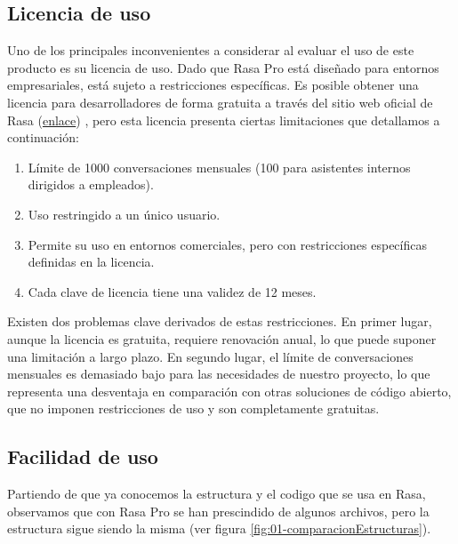 \documentclass[a4paper,11pt]{article}
\begin{document}
		\subsection{Licencia de uso}
			
			Uno de los principales inconvenientes a considerar al evaluar el uso de este producto es su licencia de uso. Dado que Rasa Pro está diseñado para entornos empresariales, está sujeto a restricciones específicas. Es posible obtener una licencia para desarrolladores de forma gratuita a través del sitio web oficial de Rasa (\textcolor{blue}{\href{https://rasa.com/docs/rasa-pro/}{enlace}}) \cite{01_RasaProIntro}, pero esta licencia presenta ciertas limitaciones que detallamos a continuación:
			
			\begin{enumerate}
				\item Límite de 1000 conversaciones mensuales (100 para asistentes internos dirigidos a empleados).
				\item Uso restringido a un único usuario.
				\item Permite su uso en entornos comerciales, pero con restricciones específicas definidas en la licencia.
				\item Cada clave de licencia tiene una validez de 12 meses.
			\end{enumerate}
			
			Existen dos problemas clave derivados de estas restricciones. En primer lugar, aunque la licencia es gratuita, requiere renovación anual, lo que puede suponer una limitación a largo plazo. En segundo lugar, el límite de conversaciones mensuales es demasiado bajo para las necesidades de nuestro proyecto, lo que representa una desventaja en comparación con otras soluciones de código abierto, que no imponen restricciones de uso y son completamente gratuitas.
			
		\subsection{Facilidad de uso}
		
			Partiendo de que ya conocemos la estructura y el codigo que se usa en Rasa, observamos que con Rasa Pro se han prescindido de algunos archivos, pero la estructura sigue siendo la misma (ver figura \ref{fig:01-comparacionEstructuras}).
			
\end{document}
